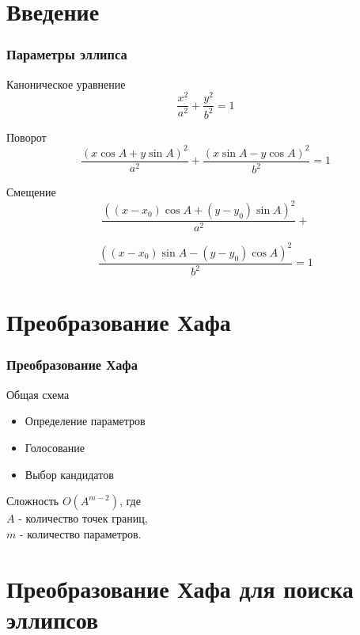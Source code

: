 \documentclass[14pt]{beamer}
\begin{document}
\section{Введение}
\begin{frame}
\frametitle{Параметры эллипса}
\small
\begin{block}{Каноническое уравнение}
$$ \frac{x^2}{a^2} + \frac{y^2}{b^2} = 1 $$
\end{block}

\begin{block}{Поворот}
$$ \frac{(x\cos A + y\sin A)^2}{a^2} + \frac{(x\sin A - y\cos A)^2}{b^2} = 1 $$
\end{block}

\begin{block}{Смещение}
  $$ \frac{((x - x_0)\cos A + (y - y_0)\sin A)^2}{a^2}  + $$
  
  $$ \frac{((x - x_0)\sin A - (y - y_0)\cos A)^2}{b^2} = 1 $$
\end{block}
\normalsize
\end{frame}

\section{Преобразование Хафа}
\begin{frame}
\frametitle{Преобразование Хафа}
\begin{block}{Общая схема}
\begin{itemize}
  \item Определение параметров
  \item Голосование
  \item Выбор кандидатов   
\end{itemize}
\end{block}

\begin{block}{Сложность}
\(O(A^{m-2})\), где \\\(A\) - количество точек границ, \\\(m\) - количество параметров.
\end{block}
\end{frame}

\section{Преобразование Хафа для поиска эллипсов}
\end{document}
